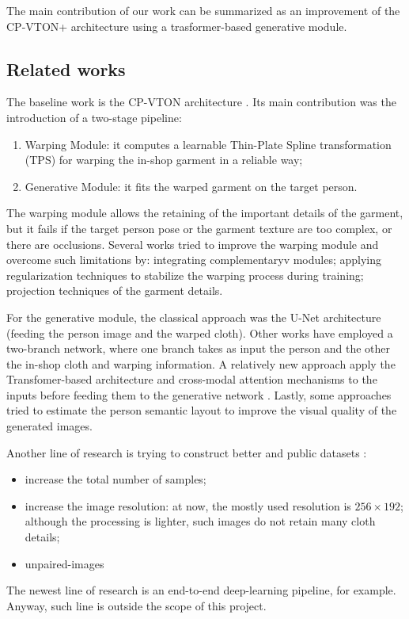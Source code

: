 The main contribution of our work can be summarized as an improvement of the CP-VTON+ architecture\cite{CP-VTON+} using a trasformer-based generative module.


\subsection{Related works}
The baseline work is the CP-VTON architecture \cite{CP-VTON}. Its main contribution was the introduction of a two-stage pipeline:
\begin{enumerate}[noitemsep]
\item Warping Module: it computes a learnable Thin-Plate Spline transformation (TPS) for warping the in-shop garment in a reliable way;
\item Generative Module: it fits the warped garment on the target person.
\end{enumerate}

The warping module allows the retaining of the important details of the garment, but it fails if the target person pose or the garment texture are too complex, or there are occlusions.
Several works tried to improve the warping module and overcome such limitations by: integrating complementaryv modules; applying regularization techniques to stabilize the warping process during training; projection techniques of the garment details.

For the generative module, the classical approach was the U-Net architecture (feeding the person image and the warped cloth).
Other works have employed a two-branch network, where one branch takes as input the person and the other the in-shop cloth and warping information.
A relatively new approach apply the Transfomer-based architecture and cross-modal attention mechanisms to the inputs before feeding them to the generative network \cite{CIT}\cite{dual-branch}.
Lastly, some approaches tried to estimate the person semantic layout to improve the visual quality of the generated images.

Another line of research is trying to construct better and public datasets \cite{dress-code}:
\begin{itemize}[noitemsep]
\item increase the total number of samples;
\item increase the image resolution: at now, the mostly used resolution is $256 \times 192$; although the processing is lighter, such images do not retain many cloth details;
\item unpaired-images
\end{itemize}
The newest line of research is an end-to-end deep-learning pipeline, for example. Anyway, such line is outside the scope of this project.

